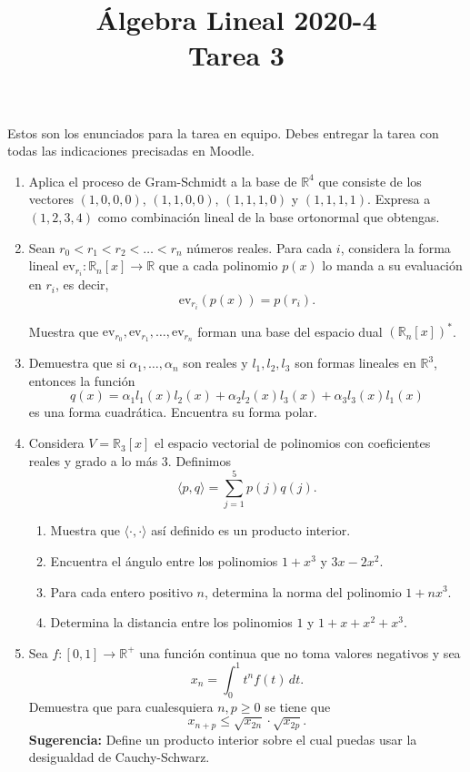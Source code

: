 \documentclass{article}
\title{Álgebra Lineal 2020-4\\ Tarea 3}
\date{ }
\begin{document}
\maketitle
Estos son los enunciados para la tarea en equipo. Debes entregar la tarea con todas las indicaciones precisadas en Moodle.

\begin{enumerate}
    \item Aplica el proceso de Gram-Schmidt a la base de $\mathbb{R}^4$ que consiste de los vectores $(1,0,0,0)$, $(1,1,0,0)$, $(1,1,1,0)$ y $(1,1,1,1)$. Expresa a $(1,2,3,4)$ como combinación lineal de la base ortonormal que obtengas.
    \item Sean $r_0<r_1<r_2<\ldots<r_n$ números reales. Para cada $i$, considera la forma lineal $\text{ev}_{r_i}:\mathbb{R}_n[x]\to \mathbb{R}$ que a cada polinomio $p(x)$ lo manda a su evaluación en $r_i$, es decir, $$\text{ev}_{r_i}(p(x))=p(r_i).$$
    
    Muestra que $\text{ev}_{r_0},\text{ev}_{r_1},\ldots, \text{ev}_{r_n}$ forman una base del espacio dual  $(\mathbb{R}_n[x])^{\ast}$.
    \item Demuestra que si $\alpha_1,\ldots,\alpha_n$ son reales y $l_1,l_2,l_3$ son formas lineales en $\mathbb{R}^3$, entonces la función $$q(x)=\alpha_1l_1(x)l_2(x)+\alpha_2l_2(x)l_3(x)+\alpha_3 l_3(x)l_1(x)$$ es una forma cuadrática. Encuentra su forma polar.
    
    \item Considera $V=\mathbb{R}_3[x]$ el espacio vectorial de polinomios con coeficientes reales y grado a lo más $3$. Definimos $$\langle p,q \rangle = \sum_{j=1}^5 p(j)q(j).$$
    
    \begin{enumerate}
        \item Muestra que $\langle \cdot, \cdot \rangle$ así definido es un producto interior.
        \item Encuentra el ángulo entre los polinomios $1+x^3$ y $3x-2x^2$.
        \item Para cada entero positivo $n$, determina la norma del polinomio $1+nx^3$.
        \item Determina la distancia entre los polinomios $1$ y $1+x+x^2+x^3$.
    \end{enumerate}
    \item Sea $f:[0,1]\to \mathbb{R}^+$ una función continua que no toma valores negativos y sea $$x_n=\int_0 ^1 t^n f(t)\, dt.$$
    Demuestra que para cualesquiera $n,p\geq 0$ se tiene que 
    $$x_{n+p}\leq \sqrt{x_{2n}}\cdot \sqrt{x_{2p}}.$$ \textbf{Sugerencia:} Define un producto interior sobre el cual puedas usar la desigualdad de Cauchy-Schwarz.
\end{enumerate}
\end{document}

